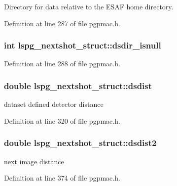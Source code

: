Directory for data relative to the E\-S\-A\-F home directory. 



Definition at line 287 of file pgpmac.\-h.

\hypertarget{structlspg__nextshot__struct_a8dea57b78b92d67d83ccbb6ed6da13ca}{
\subsubsection[{dsdir\-\_\-isnull}]{\setlength{\rightskip}{0pt plus 5cm}int lspg\-\_\-nextshot\-\_\-struct\-::dsdir\-\_\-isnull}}\label{structlspg__nextshot__struct_a8dea57b78b92d67d83ccbb6ed6da13ca}


Definition at line 288 of file pgpmac.\-h.

\hypertarget{structlspg__nextshot__struct_acab9431a911f5bb11296cbfb271fb83a}{
\subsubsection[{dsdist}]{\setlength{\rightskip}{0pt plus 5cm}double lspg\-\_\-nextshot\-\_\-struct\-::dsdist}}\label{structlspg__nextshot__struct_acab9431a911f5bb11296cbfb271fb83a}


dataset defined detector distance 



Definition at line 320 of file pgpmac.\-h.

\hypertarget{structlspg__nextshot__struct_a516827749068577217b27860a01e6041}{
\subsubsection[{dsdist2}]{\setlength{\rightskip}{0pt plus 5cm}double lspg\-\_\-nextshot\-\_\-struct\-::dsdist2}}\label{structlspg__nextshot__struct_a516827749068577217b27860a01e6041}


next image distance 



Definition at line 374 of file pgpmac.\-h.

